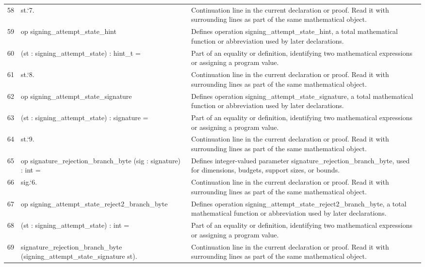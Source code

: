 \documentclass[10pt]{article}
\begin{document}
\begin{longtable}{r L{0.53\textwidth} L{0.37\textwidth}}
58 & {\ttfamily\scriptsize   st.`7.} & Continuation line in the current declaration or proof.  Read it with surrounding lines as part of the same mathematical object. \\
59 & {\ttfamily\scriptsize op signing\_attempt\_state\_hint} & Defines operation signing\_attempt\_state\_hint, a total mathematical function or abbreviation used by later declarations. \\
60 & {\ttfamily\scriptsize    (st : signing\_attempt\_state) : hint\_t =} & Part of an equality or definition, identifying two mathematical expressions or assigning a program value. \\
61 & {\ttfamily\scriptsize   st.`8.} & Continuation line in the current declaration or proof.  Read it with surrounding lines as part of the same mathematical object. \\
62 & {\ttfamily\scriptsize op signing\_attempt\_state\_signature} & Defines operation signing\_attempt\_state\_signature, a total mathematical function or abbreviation used by later declarations. \\
63 & {\ttfamily\scriptsize    (st : signing\_attempt\_state) : signature =} & Part of an equality or definition, identifying two mathematical expressions or assigning a program value. \\
64 & {\ttfamily\scriptsize   st.`9.} & Continuation line in the current declaration or proof.  Read it with surrounding lines as part of the same mathematical object. \\
65 & {\ttfamily\scriptsize op signature\_rejection\_branch\_byte (sig : signature) : int =} & Defines integer-valued parameter signature\_rejection\_branch\_byte, used for dimensions, budgets, support sizes, or bounds. \\
66 & {\ttfamily\scriptsize   sig.`6.} & Continuation line in the current declaration or proof.  Read it with surrounding lines as part of the same mathematical object. \\
67 & {\ttfamily\scriptsize op signing\_attempt\_state\_reject2\_branch\_byte} & Defines operation signing\_attempt\_state\_reject2\_branch\_byte, a total mathematical function or abbreviation used by later declarations. \\
68 & {\ttfamily\scriptsize    (st : signing\_attempt\_state) : int =} & Part of an equality or definition, identifying two mathematical expressions or assigning a program value. \\
69 & {\ttfamily\scriptsize   signature\_rejection\_branch\_byte (signing\_attempt\_state\_signature st).} & Continuation line in the current declaration or proof.  Read it with surrounding lines as part of the same mathematical object. \\

\end{longtable}
\end{document}
